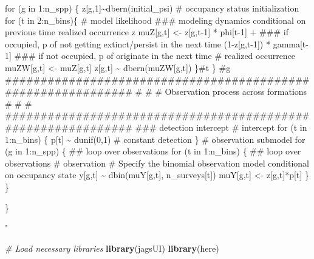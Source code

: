\documentclass[
]{article}
\newenvironment{Shaded}{\begin{snugshade}}{\end{snugshade}}
\newcommand{\CommentTok}[1]{\textcolor[rgb]{0.56,0.35,0.01}{\textit{#1}}}
\newcommand{\FunctionTok}[1]{\textcolor[rgb]{0.13,0.29,0.53}{\textbf{#1}}}
\newcommand{\NormalTok}[1]{#1}
\newcommand{\StringTok}[1]{\textcolor[rgb]{0.31,0.60,0.02}{#1}}
\begin{document}
{\begin{Shaded}
\begin{Highlighting}[]
\StringTok{       }
\StringTok{        for (g in 1:n\_spp) \{}
\StringTok{         }
\StringTok{            z[g,1]\textasciitilde{}dbern(initial\_psi) \# occupancy status initialization}
\StringTok{      }
\StringTok{                for (t in 2:n\_bins)\{}
\StringTok{              }
\StringTok{                  \# model likelihood}
\StringTok{                  \#\#\# modeling dynamics conditional on previous time realized occurrence z}
\StringTok{                  muZ[g,t] \textless{}{-} z[g,t{-}1] *  phi[t{-}1] + \#\#\# if occupied, p of not getting extinct/persist in the next time}
\StringTok{                                (1{-}z[g,t{-}1]) *  gamma[t{-}1] \#\#\#  if not occupied, p of originate in the next time}
\StringTok{                  }
\StringTok{                 \# realized occurrence}
\StringTok{                 muZW[g,t] \textless{}{-} muZ[g,t]}
\StringTok{                   z[g,t] \textasciitilde{} dbern(muZW[g,t])}
\StringTok{              }
\StringTok{          \}\#t}
\StringTok{        }
\StringTok{        \} \#g}
\StringTok{  }
\StringTok{  }
\StringTok{    \#\#\#\#\#\#\#\#\#\#\#\#\#\#\#\#\#\#\#\#\#\#\#\#\#\#\#\#\#\#\#\#\#\#\#\#\#\#\#\#\#\#\#\#\#\#\#\#\#\#\#\#\#\#\#\#\#\#\#\#\#}
\StringTok{    \#                                                           \#}
\StringTok{    \#         Observation process across formations             \#}
\StringTok{    \#                                                           \#}
\StringTok{    \#\#\#\#\#\#\#\#\#\#\#\#\#\#\#\#\#\#\#\#\#\#\#\#\#\#\#\#\#\#\#\#\#\#\#\#\#\#\#\#\#\#\#\#\#\#\#\#\#\#\#\#\#\#\#\#\#\#\#\#\#}
\StringTok{    }
\StringTok{    \#\#\#  detection intercept}
\StringTok{    \# intercept    }
\StringTok{    for (t in 1:n\_bins) \{}
\StringTok{      p[t] \textasciitilde{} dunif(0,1) \# constant detection}
\StringTok{    \}}
\StringTok{    }
\StringTok{    \# observation submodel}
\StringTok{    for (g in 1:n\_spp) \{ \#\# loop over observations }
\StringTok{      }
\StringTok{      for (t in 1:n\_bins) \{ \#\# loop over observations }
\StringTok{    }
\StringTok{          \# observation}
\StringTok{          \# Specify the binomial observation model conditional on occupancy state}
\StringTok{          y[g,t] \textasciitilde{} dbin(muY[g,t], n\_surveys[t])}
\StringTok{          muY[g,t] \textless{}{-} z[g,t]*p[t]}
\StringTok{                  }
\StringTok{        \}}
\StringTok{      }
\StringTok{    \}}
\StringTok{      }

\StringTok{\}}

\StringTok{"}

\CommentTok{\# Load necessary libraries}
\FunctionTok{library}\NormalTok{(jagsUI)}
\FunctionTok{library}\NormalTok{(here)}


\end{Highlighting}
\end{Shaded}}
\end{document}
